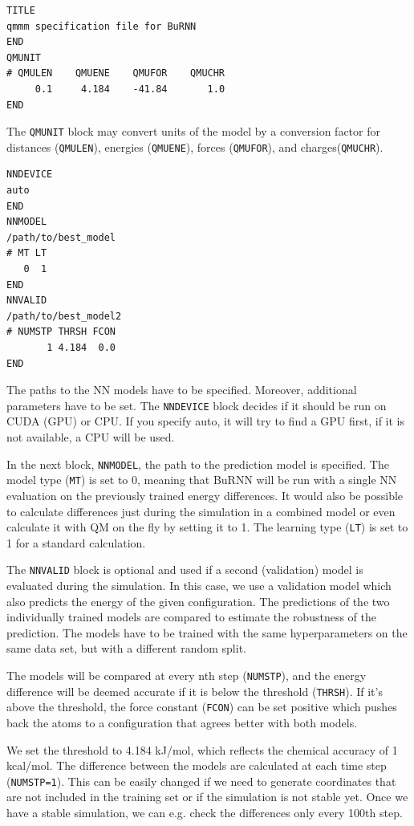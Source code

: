 \begin{lstlisting}[breaklines=true, breakatwhitespace=false]
TITLE
qmmm specification file for BuRNN  
END
QMUNIT
# QMULEN    QMUENE    QMUFOR    QMUCHR
     0.1     4.184    -41.84       1.0
END
\end{lstlisting}

The \texttt{QMUNIT} block may convert units of the model by a conversion factor for distances (\texttt{QMULEN}), energies (\texttt{QMUENE}), forces (\texttt{QMUFOR}), and charges(\texttt{QMUCHR}).

\begin{lstlisting}[breaklines=true, breakatwhitespace=false]
NNDEVICE
auto
END
NNMODEL
/path/to/best_model
# MT LT
   0  1
END
NNVALID
/path/to/best_model2
# NUMSTP THRSH FCON 
       1 4.184  0.0
END
\end{lstlisting}

The paths to the NN models have to be specified. Moreover, additional parameters have to be set. The \texttt{NNDEVICE} block decides if it should be run on CUDA (GPU) or CPU. If you specify auto, it will try to find a GPU first, if it is not available, a CPU will be used. 

In the next block, \texttt{NNMODEL}, the path to the prediction model is specified. The model type (\texttt{MT}) is set to 0, meaning that BuRNN will be run with a single NN evaluation on the previously trained energy differences. It would also be possible to calculate differences just during the simulation in a combined model or even calculate it with QM on the fly by setting it to 1. The learning type (\texttt{LT}) is set to 1 for a standard calculation. 

The \texttt{NNVALID} block is optional and used if a second (validation) model is evaluated during the simulation. In this case, we use a validation model which also predicts the energy of the given configuration. The predictions of the two individually trained models are compared to estimate the robustness of the prediction. The models have to be trained with the same hyperparameters on the same data set, but with a different random split. 

The models will be compared at every nth step (\texttt{NUMSTP}), and the energy difference will be deemed accurate if it is below the threshold (\texttt{THRSH}). If it’s above the threshold, the force constant (\texttt{FCON}) can be set positive which pushes back the atoms to a configuration that agrees better with both models. 

We set the threshold to 4.184 kJ/mol, which reflects the chemical accuracy of 1 kcal/mol. The difference between the models are calculated at each time step (\texttt{NUMSTP=1}). This can be easily changed if we need to generate coordinates that are not included in the training set or if the simulation is not stable yet. Once we have a stable simulation, we can e.g. check the differences only every 100th step.

